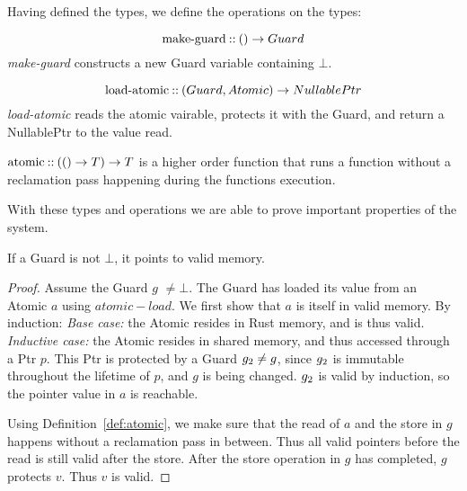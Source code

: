 Having defined the types, we define the operations on the types:

\begin{definition}
\begin{equation}\label{eq:make-guard}
  \text{make-guard\:::\:} () \to Guard
\end{equation}
\emph{make-guard} constructs a new Guard variable containing $\bot$.

\begin{equation}\label{eq:load-atomic}
  \text{load-atomic\:::\:} (Guard, Atomic) \to NullablePtr
\end{equation}
\emph{load-atomic} reads the atomic vairable, protects it with the Guard, and return a NullablePtr
to the value read.
\end{definition}

\begin{definition}\label{def:atomic}
  $\text{atomic\:::\:} (() \to T) \to T$ is a higher order function that runs a function without
  a reclamation pass happening during the functions execution.
\end{definition}




With these types and operations we are able to prove important properties of the system.

\begin{theorem}\label{thm:guard-valid}
  If a Guard is not $\bot$, it points to valid memory.
\end{theorem}
\begin{proof}
  Assume the Guard $g$ $\neq \bot$.
  The Guard has loaded its value from an Atomic $a$ using $atomic-load$.
We first show that $a$ is itself in valid memory. By induction:
\emph{Base case:} the Atomic resides in Rust memory, and is thus valid. \emph{Inductive case:} the
Atomic resides in shared memory, and thus accessed through a Ptr $p$.  This Ptr is protected by a
Guard $g\sb{2} \neq g$, since $g\sb{2}$ is immutable throughout the lifetime of $p$, and $g$ is
being changed. $g\sb{2}$ is valid by induction, so the pointer value in $a$ is reachable.

Using Definition~\ref{def:atomic}, we make sure that the read of $a$ and the store in $g$ happens
without a reclamation pass in between. Thus all valid pointers before the read is still valid after
the store.  After the store operation in $g$ has completed, $g$ protects $v$. Thus $v$ is valid.
\end{proof}


